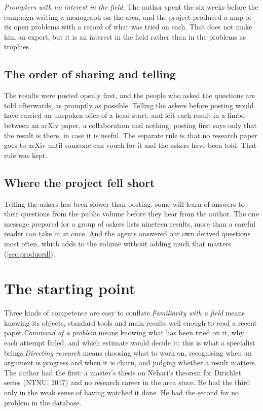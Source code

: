 \documentclass[11pt]{amsart}
\newcommand*{\sectionbreak}{\clearpage} %
\begin{document}
\emph{Prompters with no interest in the field.} The author spent the six weeks
before the campaign writing a monograph on the area, and the project produced a
map of its open problems with a record of what was tried on each. That does not
make him an expert, but it is an interest in the field rather than in the
problems as trophies.

\subsection*{The order of sharing and telling}
The results were posted openly first, and the people who asked the questions
are told afterwards, as promptly as possible. Telling the askers before posting
would have carried an unspoken offer of a head start, and left each result in a
limbo between an arXiv paper, a collaboration and nothing; posting first says
only that the result is there, in case it is useful. The separate rule is that
no research paper goes to arXiv until someone can vouch for it and the askers
have been told. That rule was kept.

\subsection*{Where the project fell short}
Telling the askers has been slower than posting: some will learn of answers to
their questions from the public volume before they hear from the author. The
one message prepared for a group of askers lists nineteen results, more than a
careful reader can take in at once. And the agents answered our own derived
questions most often, which adds to the volume without adding much that matters
(\cref{sec:produced}).

\sectionbreak
\section{The starting point}\label{sec:start}

Three kinds of competence are easy to conflate.\@ \emph{Familiarity with a
field} means knowing its objects, standard tools and main results well enough
to read a recent paper.\@ \emph{Command of a problem} means knowing what has
been tried on it, why each attempt failed, and which estimate would decide it;
this is what a specialist brings.\@ \emph{Directing research} means choosing
what to work on, recognising when an argument is progress and when it is churn,
and judging whether a result matters. The author had the first: a master's
thesis on Nehari's theorem for Dirichlet series (NTNU, 2017) and no research
career in the area since. He had the third only in the weak sense of having
watched it done. He had the second for no problem in the database.
\end{document}
